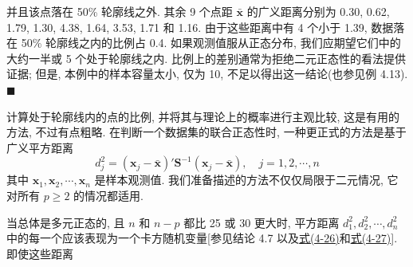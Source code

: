 并且该点落在 50\% 轮廓线之外. 其余 9 个点距 $\bar{\mathbf{x}}$ 的广义距离分别为 0.30, 0.62, 1.79, 1.30, 4.38, 1.64, 3.53, 1.71 和 1.16. 由于这些距离中有 4 个小于 1.39, 数据落在 50\% 轮廓线之内的比例占 0.4. 如果观测值服从正态分布, 我们应期望它们中的大约一半或 5 个处于轮廓线之内. 比例上的差别通常为拒绝二元正态性的看法提供证据; 但是, 本例中的样本容量太小, 仅为 10, 不足以得出这一结论(也参见例 4.13).\hfill$\blacksquare$

计算处于轮廓线内的点的比例, 并将其与理论上的概率进行主观比较, 这是有用的方法, 不过有点粗略. 在判断一个数据集的联合正态性时, 一种更正式的方法是基于广义平方距离
\label{eq:4-32}
\begin{equation}
d_{j}^{2}=(\mathbf{x}_{j}-\bar{\mathbf{x}})'\mathbf{S}^{-1}(\mathbf{x}_{j}-\bar{\mathbf{x}}),\quad j=1,2,\cdots,n \tag{4-32}
\end{equation}
其中 $\mathbf{x}_{1},\mathbf{x}_{2},\cdots,\mathbf{x}_{n}$ 是样本观测值. 我们准备描述的方法不仅仅局限于二元情况, 它对所有 $p\ge 2$ 的情况都适用.

当总体是多元正态的, 且 $n$ 和 $n-p$ 都比 25 或 30 更大时, 平方距离 $d_{1}^{2},d_{2}^{2},\cdots,d_{n}^{2}$ 中的每一个应该表现为一个卡方随机变量[参见结论 4.7 以及\hyperref[eq:4-26]{式(4-26)}和\hyperref[eq:4-27]{式(4-27)}]. 即使这些距离
